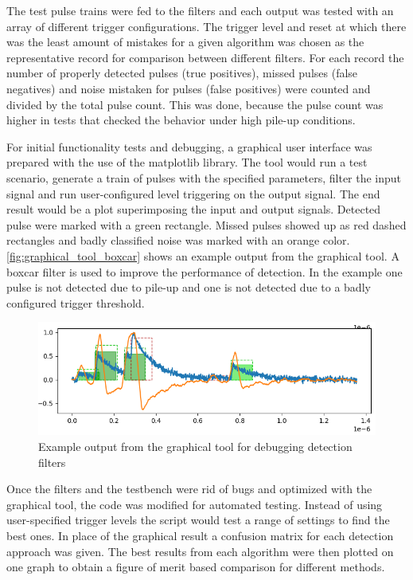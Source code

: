 The test pulse trains were fed to the filters and each output was 
tested with an array of different trigger configurations.
The trigger level and reset at which there was the least amount of mistakes for
a given algorithm was chosen as the representative record for comparison
between different filters.
For each record the number of properly detected pulses (true positives),
missed pulses (false negatives) and noise mistaken for pulses (false positives) 
were counted and divided by the total pulse count.
This was done, because the pulse count was higher in tests that checked 
the behavior under high pile-up conditions.


For initial functionality tests and debugging, a graphical user interface
was prepared with the use of the matplotlib library.
The tool would run a test scenario, generate a train of pulses with 
the specified parameters, filter the input signal and run
user-configured level triggering on the output signal.
The end result would be a plot superimposing the input and output signals.
Detected pulse were marked with a green rectangle. Missed pulses
showed up as red dashed rectangles and badly classified noise
was marked with an orange color. \autoref{fig:graphical_tool_boxcar}
shows an example output from the graphical tool. A boxcar filter is used 
to improve the performance of detection. In the example one pulse
is not detected due to pile-up and one is not detected due
to a badly configured trigger threshold.

\begin{figure}[H]
  \centering
  \includegraphics[width=\linewidth]{media/graphical_tool_boxcar.png}
  \caption{Example output from the graphical tool for debugging detection filters}
  \label{fig:graphical_tool_boxcar} 
\end{figure}

Once the filters and the testbench were rid of bugs and optimized 
with the graphical tool, the code was modified for automated testing.
Instead of using user-specified trigger levels the script would 
test a range of settings to find the best ones. In place of the graphical
result a confusion matrix for each detection approach was given.
The best results from each algorithm were then plotted on
one graph to obtain a figure of merit based comparison for 
different methods.



